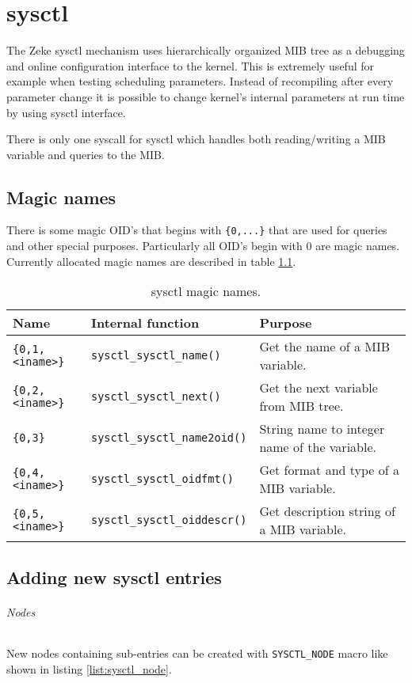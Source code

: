 \chapter{sysctl}

The Zeke sysctl mechanism uses hierarchically organized \ac{MIB} tree as a
debugging and online configuration interface to the kernel. This is extremely
useful for example when testing scheduling parameters. Instead of recompiling
after every parameter change it is possible to change kernel's internal
parameters at run time by using sysctl interface.

There is only one syscall for sysctl which handles both reading/writing a
\ac{MIB} variable and queries to the MIB.

\section{Magic names}

There is some magic OID's that begins with \verb+{0,...}+ that are used for
queries and other special purposes. Particularly all OID's begin with 0 are
magic names. Currently allocated magic names are described in table
\ref{table:sysctlmagic}.

\begin{table}
\caption{sysctl magic names.}
\label{table:sysctlmagic}
\begin{tabular}{lll}
Name                & Internal function        & Purpose\\
\hline
\verb+{0,1,<iname>}+ & \verb+sysctl_sysctl_name()+     & Get the name of a MIB variable.\\
\verb+{0,2,<iname>}+ & \verb+sysctl_sysctl_next()+     & Get the next variable from MIB tree.\\
\verb+{0,3}+            & \verb+sysctl_sysctl_name2oid()+ & String name to integer name of the variable.\\
\verb+{0,4,<iname>}+ & \verb+sysctl_sysctl_oidfmt()+   & Get format and type of a MIB variable.\\
\verb+{0,5,<iname>}+ & \verb+sysctl_sysctl_oiddescr()+ & Get description string of a MIB variable.
\end{tabular}
\end{table}

\section{Adding new sysctl entries}

\subparagraph{Nodes}
New nodes containing sub-entries can be created with \verb+SYSCTL_NODE+ macro
like shown in listing \ref{list:sysctl_node}.

